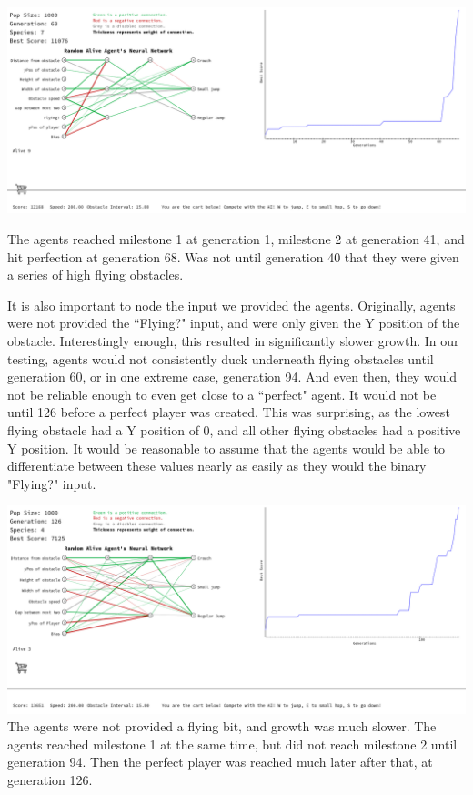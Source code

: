 \documentclass[12pt]{article}
\begin{document}
\begin{flushleft}
\noindent\includegraphics[scale=.4]{late_perfect.png}

The agents reached milestone 1 at generation 1, milestone 2 at generation 41, and hit perfection at generation 68. Was not until generation 40 that they were given a series of high flying obstacles.

\hfill

It is also important to node the input we provided the agents. Originally, agents were not provided the ``Flying?" input, and were only given the Y position of the obstacle. Interestingly enough, this resulted in significantly slower growth. In our testing, agents would not consistently duck underneath flying obstacles until generation 60, or in one extreme case, generation 94. And even then, they would not be reliable enough to even get close to a ``perfect" agent. It would not be until 126 before a perfect player was created. This was surprising, as the lowest flying obstacle had a Y position of 0, and all other flying obstacles had a positive Y position. It would be reasonable to assume that the agents would be able to differentiate between these values nearly as easily as they would the binary "Flying?" input.

\hfill

\noindent\includegraphics[scale=.4]{no_flying_bit.png}
The agents were not provided a flying bit, and growth was much slower. The agents reached milestone 1 at the same time, but did not reach milestone 2 until generation 94. Then the perfect player was reached much later after that, at generation 126.


\end{flushleft}
\end{document}
